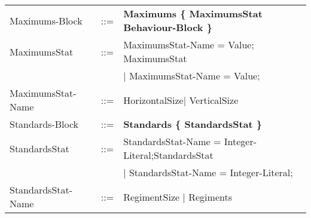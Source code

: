 \begin{tabular}{ l l l }
			Maximums-Block	   &	::=	 & \bf{Maximums} \bf{\{} MaximumsStat Behaviour-Block \bf{\}}	\\
			MaximumsStat	   &	::=  & MaximumsStat-Name = Value; MaximumsStat  \\
							   &		 & $\mid$ MaximumsStat-Name = Value;   \\
			MaximumsStat-Name  &	::=  & HorizontalSize$\mid$ VerticalSize					\\
			Standards-Block	   &    ::=  & \bf{Standards} \bf{\{ } StandardsStat \bf{\} }	\\
			StandardsStat	   & 	::=	 & StandardsStat-Name = Integer-Literal;StandardsStat \\
							   &		 & $\mid$ StandardsStat-Name = Integer-Literal; \\
			StandardsStat-Name & 	::=	 & RegimentSize	$\mid$ Regiments \\
		\end{tabular}